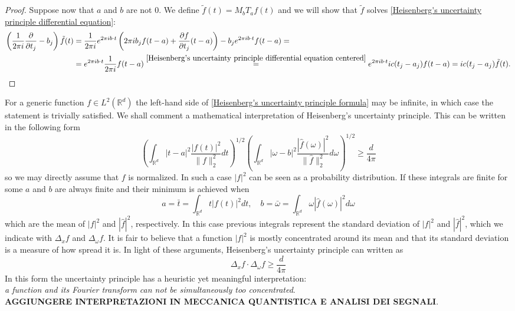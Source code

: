 \documentclass[corpo=11pt, stile=classica, tipotesi=custom,
greek, evenboxes, english]{toptesi}
\numberwithin{equation}{chapter}
\newcommand{\R}{\mathbb{R}} %
\newcommand{\pdfrac}[2]{\dfrac{\partial #1}{\partial #2}}
\begin{document}
\begin{proof}
{	Suppose now that $a$ and $b$ are not 0. We define $\tilde{f}(t) = M_b T_a f(t)$ and we will show that $\tilde{f}$ solves \eqref{Heisenberg's uncertainty principle differential equation}:
	\begin{align*}
		\left(\dfrac{1}{2\pi i}\pdfrac{}{t_j} - b_j\right)\tilde{f}(t) &= \dfrac{1}{2\pi i} e^{2 \pi i b \cdot t} \left(2\pi i b_j f(t-a) + \pdfrac{f}{t_j}(t-a)\right) - b_j e^{2 \pi i b \cdot t}f(t-a) =\\
		&=e^{2 \pi i b \cdot t}\dfrac{1}{2 \pi i}f(t-a) \overset{\eqref{Heisenberg's uncertainty principle differential equation centered}}{=} e^{2 \pi i b \cdot t} i c (t_j-a_j) f(t-a) = i c (t_j-a_j) \tilde{f}(t).
	\end{align*}
	}
\end{proof}
For a generic function $f \in L^2(\R^d)$ the left-hand side of \eqref{Heisenberg's uncertainty principle formula} may be infinite, in which case the statement is trivially satisfied. {\color{blue}We shall comment a mathematical interpretation of Heisenberg's uncertainty principle. This can be written in the following form
\begin{equation*}
	\left(\int_{\R^d}|t-a|^2 \dfrac{|f(t)|^2}{\|f\|_2^2} dt\right)^{1/2} \left(\int_{\R^d} |\omega-b|^2 \dfrac{|\hat{f}(\omega)|^2}{\|\hat{f}\|_2^2}d\omega\right)^{1/2} \geq \dfrac{d}{4\pi}
\end{equation*}
so we may directly assume that $f$ is normalized. In such a case $|f|^2$ can be seen as a probability distribution. If these integrals are finite for some $a$ and $b$ are always finite and their minimum is achieved when
\begin{equation*}
	a = \bar{t} = \int_{\R^d} t |f(t)|^2 dt, \quad b = \bar{\omega} = \int_{\R^d} \omega |\hat{f}(\omega)|^2 d\omega
\end{equation*}
which are the mean of $|f|^2$ and $|\hat{f}|^2$, respectively. In this case previous integrals represent the standard deviation of $|f|^2$ and $|\hat{f}|^2$, which we indicate with $\Delta_x f$ and $\Delta_{\omega} f$. It is fair to believe that a function $|f|^2$ is mostly concentrated around its mean and that its standard deviation is a measure of how spread it is. In light of these arguments, Heisenberg's uncertainty principle can written as
\begin{equation*}
	\Delta_x f \cdot \Delta_{\omega} f \geq \dfrac{d}{4\pi}
\end{equation*}
In this form the uncertainty principle has a heuristic yet meaningful interpretation:\\
\emph{a function and its Fourier transform can not be simultaneously too concentrated}.\\
\textbf{AGGIUNGERE INTERPRETAZIONI IN MECCANICA QUANTISTICA E ANALISI DEI SEGNALI}.}
\end{document}
